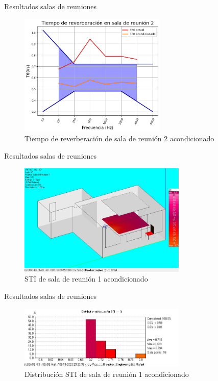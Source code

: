 \documentclass{sintefbeamer}
\begin{document}
\begin{frame}{Resultados salas de reuniones}
    \begin{figure}
        \centering
        \includegraphics[width=7cm]{images/DIN/DIN sala reunion 2 comparacion.png}
        \caption{Tiempo de reverberación de sala de reunión 2 acondicionado}
        \label{fig:din sala 2 acond}
    \end{figure}
\end{frame}

\begin{frame}{Resultados salas de reuniones}
    \begin{figure}
        \centering
        \includegraphics[width=8cm]{images/STI acondicionado/STI_Reunion1_ConAcond.jpg}
        \caption{STI de sala de reunión 1 acondicionado}
        \label{fig:STI sala 1 acond}
    \end{figure}
\end{frame}

\begin{frame}{Resultados salas de reuniones}
    \begin{figure}
        \centering
        \includegraphics[width=8cm]{images/STI acondicionado/STIdist_Reunion1_ConAcond.jpg}
        \caption{Distribución STI de sala de reunión 1 acondicionado}
        \label{fig:dis STI sala 1 acond}
    \end{figure}
\end{frame}
\end{document}
